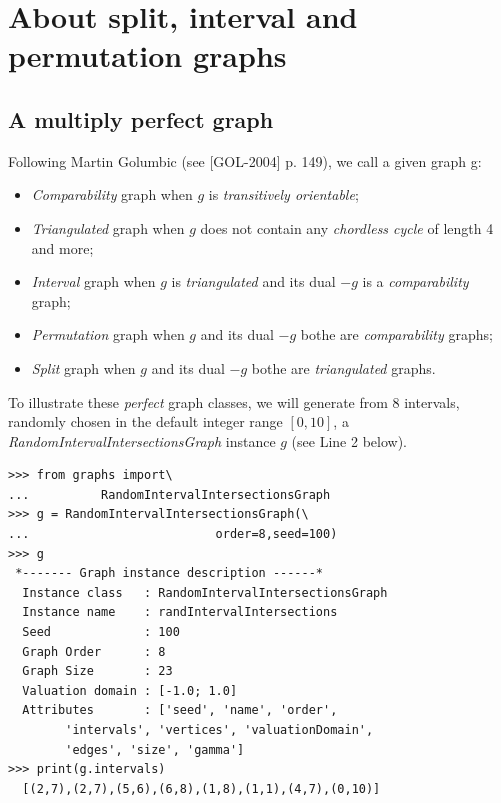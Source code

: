 \chapter{About split, interval and permutation graphs}
\label{sec:25}

\abstract*{}

\abstract{}

\tableofcontents


\section{A multiply perfect graph}
\label{sec:25.1}

Following Martin Golumbic (see [GOL-2004] p. 149), we call a given graph g:
\begin{itemize}
\item \emph{Comparability} graph when $g$  is \emph{transitively orientable};
\item \emph{Triangulated} graph when $g$ does not contain any \emph{chordless cycle} of length 4 and more;
\item \emph{Interval} graph when $g$ is \emph{triangulated} and its dual $-g$ is a \emph{comparability} graph;
\item \emph{Permutation} graph when $g$ and its dual $-g$ bothe are \emph{comparability} graphs;
\item \emph{Split} graph when $g$ and its dual $-g$ bothe are \emph{triangulated} graphs.
\end{itemize}

To illustrate these \emph{perfect} graph classes, we will generate from 8 intervals, randomly chosen in the default integer range $[0,10]$, a \emph{RandomIntervalIntersectionsGraph} instance $g$ (see Line 2 below). 
\begin{lstlisting}
>>> from graphs import\
...          RandomIntervalIntersectionsGraph
>>> g = RandomIntervalIntersectionsGraph(\
...                          order=8,seed=100)
>>> g
 *------- Graph instance description ------*
  Instance class   : RandomIntervalIntersectionsGraph
  Instance name    : randIntervalIntersections
  Seed             : 100
  Graph Order      : 8
  Graph Size       : 23
  Valuation domain : [-1.0; 1.0]
  Attributes       : ['seed', 'name', 'order',
        'intervals', 'vertices', 'valuationDomain',
        'edges', 'size', 'gamma']
>>> print(g.intervals)
  [(2,7),(2,7),(5,6),(6,8),(1,8),(1,1),(4,7),(0,10)]
\end{lstlisting}

